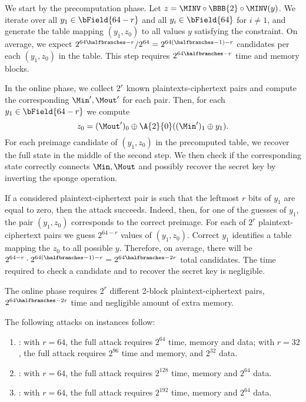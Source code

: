 We start by the precomputation phase.
Let $z = \MINV \circ \BBB{2} \circ \MINV(y)$. We iterate over all $y_1 \in \bField{64-r}$ and all $y_i \in \bField{64}$ for $i \ne 1$, and generate the table mapping $(y_1, z_0)$ to all values $y$ satisfying the constraint. 
On average, we expect $2^{64\halfbranches-r}/2^{64}=2^{64(\halfbranches-1)-r}$ candidates per each $(y_1, z_0)$ in the table. 
This step requires $2^{64\halfbranches-r}$ time and memory blocks.

In the online phase,
we collect $2^r$ known plaintexts-ciphertext pairs and compute the corresponding $\Min',\Mout'$ for each pair. Then, for each $y_1 \in \bField{64-r}$ we compute
$$
z_0 = (\Mout')_0 \oplus \A{2}{0} ((\Min')_1 \oplus y_1).
$$
For each preimage candidate of $(y_1, z_0)$ in the precomputed table, we recover the full state in the middle of the second step. We then check if the corresponding state correctly connects $\Min,\Mout$ and possibly recover the secret key by inverting the sponge operation.

If a considered plaintext-ciphertext pair is such that the leftmost $r$ bits of $y_1$ are equal to zero, then the attack succeeds. Indeed, then, for one of the guesses of $y_1$, the pair $(y_1, z_0)$ corresponds to the correct preimage. 
For each of $2^r$ plaintext-ciphertext pairs we guess $2^{64-r}$ values of $(y_1, z_0)$. Correct $y_1$ identifies a table mapping the 
$z_0$ to all possible $y$. Therefore, on average, there will be $2^{64-r}\cdot 2^{64(\halfbranches-1)-r}= 2^{64\halfbranches-2r}$ total candidates. The time required to check a candidate and to recover the secret key is negligible.

The online phase requires $2^r$ different 2-block plaintext-ciphertext pairs, $2^{64\halfbranches-2r}$ time and negligible amount of extra memory.

The following attacks on \aead{} instances follow:
\begin{enumerate}
    \item {}: with $r=64$, the full attack requires $2^{64}$ time, memory and data; with $r=32$, the full attack requires $2^{96}$ time and memory, and $2^{32}$ data.

    \item {}: with $r=64$, the full attack requires $2^{128}$ time, memory and $2^{64}$ data.
    
    \item {}: with $r=64$, the full attack requires $2^{192}$ time, memory and $2^{64}$ data.
\end{enumerate}

